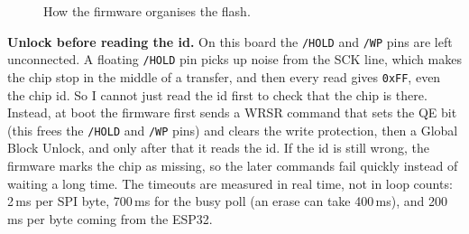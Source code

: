 \documentclass[a4paper,10pt]{article}
\begin{document}
\begin{figure}[H]
\centering
{}
\caption{How the firmware organises the flash.}
\label{fig:nor-map}
\end{figure}

\textbf{Unlock before reading the id.} On this board the \texttt{/HOLD} and \texttt{/WP}
pins are left unconnected. A floating \texttt{/HOLD} pin picks up noise from the SCK line,
which makes the chip stop in the middle of a transfer, and then every read gives
\texttt{0xFF}, even the chip id. So I cannot just read the id first to check that the chip is
there. Instead, at boot the firmware first sends a WRSR command that sets the QE bit (this
frees the \texttt{/HOLD} and \texttt{/WP} pins) and clears the write protection, then a
Global Block Unlock, and only after that it reads the id. If the id is still wrong, the
firmware marks the chip as missing, so the later commands fail quickly instead of waiting a
long time. The timeouts are measured in real time, not in loop counts: 2\,ms per SPI byte,
700\,ms for the busy poll (an erase can take 400\,ms), and 200\,ms per byte coming from the
ESP32.
\end{document}
